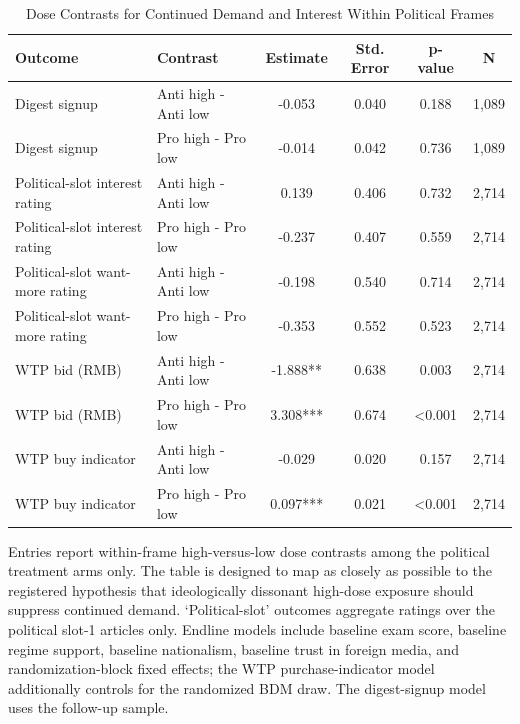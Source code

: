 \begin{table}[H]
\centering
\caption{Dose Contrasts for Continued Demand and Interest Within Political Frames}
\label{tab:dissonant_highdose_demand}
\footnotesize
\begin{threeparttable}
\begin{tabular}{llcccc}
\toprule
Outcome & Contrast & Estimate & Std. Error & p-value & N \\
\midrule
Digest signup & Anti high - Anti low & -0.053 & 0.040 & 0.188 & 1,089 \\
Digest signup & Pro high - Pro low & -0.014 & 0.042 & 0.736 & 1,089 \\
Political-slot interest rating & Anti high - Anti low & 0.139 & 0.406 & 0.732 & 2,714 \\
Political-slot interest rating & Pro high - Pro low & -0.237 & 0.407 & 0.559 & 2,714 \\
Political-slot want-more rating & Anti high - Anti low & -0.198 & 0.540 & 0.714 & 2,714 \\
Political-slot want-more rating & Pro high - Pro low & -0.353 & 0.552 & 0.523 & 2,714 \\
WTP bid (RMB) & Anti high - Anti low & -1.888** & 0.638 & 0.003 & 2,714 \\
WTP bid (RMB) & Pro high - Pro low & 3.308*** & 0.674 & <0.001 & 2,714 \\
WTP buy indicator & Anti high - Anti low & -0.029 & 0.020 & 0.157 & 2,714 \\
WTP buy indicator & Pro high - Pro low & 0.097*** & 0.021 & <0.001 & 2,714 \\
\bottomrule
\end{tabular}
\begin{tablenotes}[flushleft]
\footnotesize
\item Entries report within-frame high-versus-low dose contrasts among the political treatment arms only. The table is designed to map as closely as possible to the registered hypothesis that ideologically dissonant high-dose exposure should suppress continued demand. `Political-slot' outcomes aggregate ratings over the political slot-1 articles only. Endline models include baseline exam score, baseline regime support, baseline nationalism, baseline trust in foreign media, and randomization-block fixed effects; the WTP purchase-indicator model additionally controls for the randomized BDM draw. The digest-signup model uses the follow-up sample.
\end{tablenotes}
\end{threeparttable}
\end{table}
